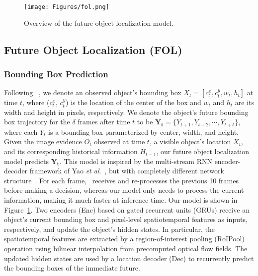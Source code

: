 \documentclass[letterpaper, 10 pt, conference]{ieeeconf}
\theoremstyle{definition}
\theoremstyle{remark}
\newcommand{\etal}{\textit{et al}.}
\begin{document}
\begin{figure}
    \vspace{5pt}
    \centering
    \texttt{[image: Figures/fol.png]}
    \caption{
        Overview of the future object localization model.
    }
    \label{fig:fol}
    \vspace{-15pt}
\end{figure}

\subsection{Future Object Localization (FOL)}

\subsubsection{Bounding Box Prediction}
Following ~\cite{yao2018egocentric}, we denote an
observed object's bounding box  $X_t=[c^x_t,c^y_t,w_t,h_t]$ at
time $t$, where ($c^x_t$, $c^y_t$) is the location of the center of
the box and $w_t$ and $h_t$ are its width and height in pixels,
respectively. We denote the object's future bounding box trajectory
for the $\delta$ frames after time $t$ to be
$\mathbf{Y_t}=\{Y_{t+1},Y_{t+2},\cdots,Y_{t+\delta}\}$, where each
$Y_t$ is a bounding box parameterized by center, width, and height.
Given the image evidence $O_t$ observed at time $t$, a visible
object's location $X_t$, and its corresponding historical information
$H_{t-1}$, our future object localization model predicts
$\mathbf{Y_t}$. This model is
inspired by the
multi-stream RNN encoder-decoder framework of Yao
\etal~\cite{yao2018egocentric}, but with completely different network
structure~\cite{xu2018temporal}.
For each frame,~\cite{yao2018egocentric} receives and
re-processes the previous 10 frames
before making a decision, whereas
our model only needs to process the current information, making it
much faster at inference time. Our model is shown in 
Figure~\ref{fig:fol}.
Two encoders (Enc) based on gated recurrent units (GRUs) receive
an object's current bounding box and pixel-level spatiotemporal
features as inputs, respectively, and update the object's hidden
states. In particular, the spatiotemporal 
features are extracted by a
region-of-interest pooling (RoIPool) operation using bilinear
interpolation from precomputed optical flow fields. 
The updated hidden states are used by a
location decoder (Dec) to recurrently predict the bounding boxes
of the immediate future.
\end{document}
